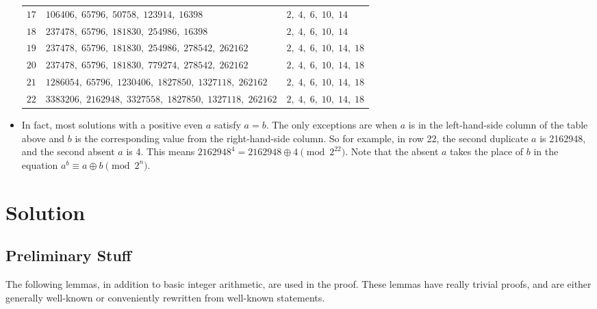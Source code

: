 \documentclass[1gpt]{article}
\theoremstyle{break}
\newcommand{\xor}{\oplus}
\begin{document}
\begin{itemize}
\begin{table}[h]
\begin{tabular}{|c|l|l|}
                $17$ & $106406,\; 65796,\; 50758,\; 123914,\; 16398$                 & $2,\; 4,\; 6,\; 10,\; 14$ \\
                $18$ & $237478,\; 65796,\; 181830,\; 254986,\; 16398$                & $2,\; 4,\; 6,\; 10,\; 14$ \\
                $19$ & $237478,\; 65796,\; 181830,\; 254986,\; 278542,\; 262162$       & $2,\; 4,\; 6,\; 10,\; 14,\; 18$ \\
                $20$ & $237478,\; 65796,\; 181830,\; 779274,\; 278542,\; 262162$       & $2,\; 4,\; 6,\; 10,\; 14,\; 18$ \\
                $21$ & $1286054,\; 65796,\; 1230406,\; 1827850,\; 1327118,\; 262162$   & $2,\; 4,\; 6,\; 10,\; 14,\; 18$ \\
                $22$ & $3383206,\; 2162948,\; 3327558,\; 1827850,\; 1327118,\; 262162$ & $2,\; 4,\; 6,\; 10,\; 14,\; 18$ \\
                \hline
            \end{tabular}
        \end{table}

        \item

            In fact, most solutions with a positive even $a$ satisfy $a=b$. The
            only exceptions are when $a$ is in the left-hand-side column of the
            table above and $b$ is the corresponding value from the
            right-hand-side column. So for example, in row 22, the second
            duplicate $a$ is 2162948, and the second absent $a$ is 4. This
            means $2162948^4 = 2162948 \xor 4 \pmod{2^{22}}$. Note that the
            absent $a$ takes the place of $b$ in the equation $a^b \equiv a
            \xor b \pmod{2^n}$.

\end{itemize}

\section{Solution}

\subsection{Preliminary Stuff}

The following lemmas, in addition to basic integer arithmetic, are used in the
proof. These lemmas have really trivial proofs, and are either generally
well-known or conveniently rewritten from well-known statements.
\end{document}
